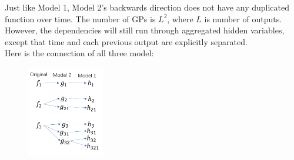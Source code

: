 \documentclass{article}
\begin{document}
Just like Model 1, Model 2's backwards direction does not have any duplicated function over time. The number of GPs is $L^2$, where $L$ is number of outputs. However, the dependencies will still run through aggregated hidden variables, except that time and each previous output are explicitly separated.\\

Here is the connection of all three model:

\begin{figure}[H]
\centering
\includegraphics[width=0.3\textwidth]{new3.png}

\end{figure}
\end{document}
